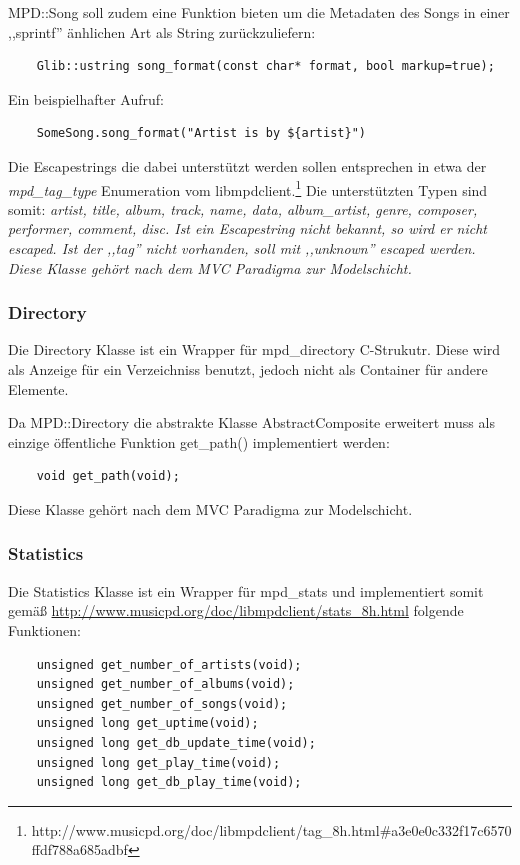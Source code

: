 MPD::Song soll zudem eine Funktion bieten um die Metadaten des Songs in einer ,,sprintf'' änhlichen Art als String zurückzuliefern:
\begin{verbatim}
    Glib::ustring song_format(const char* format, bool markup=true);
\end{verbatim}

Ein beispielhafter Aufruf:
\begin{verbatim}
    SomeSong.song_format("Artist is by ${artist}") 
\end{verbatim}

Die Escapestrings die dabei unterstützt werden sollen entsprechen in etwa der \textit{mpd\_tag\_type} Enumeration vom libmpdclient.\footnote{http://www.musicpd.org/doc/libmpdclient/tag\_8h.html\#a3e0e0c332f17c6570ffdf788a685adbf}
Die unterstützten Typen sind somit: \it artist, title, album, track, name, data, album\_artist, genre, composer, performer, comment, disc\rm.
Ist ein Escapestring nicht bekannt, so wird er nicht escaped. Ist der ,,tag'' nicht vorhanden, soll mit ,,unknown'' escaped werden.
\\
Diese Klasse gehört nach dem MVC Paradigma zur Modelschicht.

\subsubsection{Directory}
Die Directory Klasse ist ein Wrapper für mpd\_directory C-Strukutr. Diese wird als Anzeige für ein Verzeichniss benutzt, jedoch nicht als Container für andere Elemente.

Da MPD::Directory die abstrakte Klasse AbstractComposite erweitert muss als
einzige öffentliche Funktion get\_path() implementiert werden:
\begin{verbatim}
    void get_path(void);
\end{verbatim}

Diese Klasse gehört nach dem MVC Paradigma zur Modelschicht.

\newpage
\subsubsection{Statistics}
Die Statistics Klasse ist ein Wrapper für mpd\_stats und
implementiert somit gemäß \url{http://www.musicpd.org/doc/libmpdclient/stats\_8h.html}
folgende Funktionen:
\begin{verbatim}
    unsigned get_number_of_artists(void);
    unsigned get_number_of_albums(void);
    unsigned get_number_of_songs(void);
    unsigned long get_uptime(void);
    unsigned long get_db_update_time(void);
    unsigned long get_play_time(void);
    unsigned long get_db_play_time(void);
\end{verbatim}


